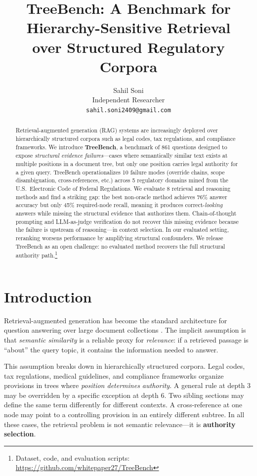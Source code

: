 \documentclass[11pt]{article}
\title{\textbf{TreeBench: A Benchmark for Hierarchy-Sensitive Retrieval\\over Structured Regulatory Corpora}}
\author{
  Sahil Soni\\
  Independent Researcher\\
  \texttt{sahil.soni2409@gmail.com}
}
\date{}
\begin{document}
\maketitle

\begin{abstract}
Retrieval-augmented generation (RAG) systems are increasingly deployed over hierarchically structured corpora such as legal codes, tax regulations, and compliance frameworks. We introduce \textbf{TreeBench}, a benchmark of 861 questions designed to expose \emph{structural evidence failures}---cases where semantically similar text exists at multiple positions in a document tree, but only one position carries legal authority for a given query. TreeBench operationalizes 10 failure modes (override chains, scope disambiguation, cross-references, etc.) across 5 regulatory domains mined from the U.S.\ Electronic Code of Federal Regulations. We evaluate 8 retrieval and reasoning methods and find a striking gap: the best non-oracle method achieves 76\% answer accuracy but only 45\% required-node recall, meaning it produces correct-\emph{looking} answers while missing the structural evidence that authorizes them. Chain-of-thought prompting and LLM-as-judge verification do not recover this missing evidence because the failure is upstream of reasoning---in context selection. In our evaluated setting, reranking worsens performance by amplifying structural confounders. We release TreeBench as an open challenge: no evaluated method recovers the full structural authority path.\footnote{Dataset, code, and evaluation scripts: \url{https://github.com/whitepaper27/TreeBench}}
\end{abstract}


\section{Introduction}
\label{sec:intro}

Retrieval-augmented generation has become the standard architecture for question answering over large document collections \citep{lewis2020rag}. The implicit assumption is that \emph{semantic similarity} is a reliable proxy for \emph{relevance}: if a retrieved passage is ``about'' the query topic, it contains the information needed to answer.

This assumption breaks down in hierarchically structured corpora. Legal codes, tax regulations, medical guidelines, and compliance frameworks organize provisions in trees where \emph{position determines authority}. A general rule at depth 3 may be overridden by a specific exception at depth 6. Two sibling sections may define the same term differently for different contexts. A cross-reference at one node may point to a controlling provision in an entirely different subtree. In all these cases, the retrieval problem is not semantic relevance---it is \textbf{authority selection}.
\end{document}
